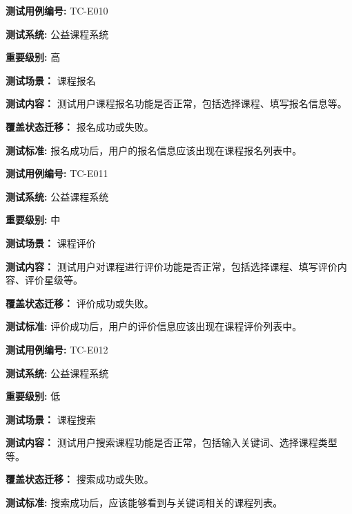 \begin{framed} \textbf{测试用例编号:} TC-E010

\textbf{测试系统:} 公益课程系统

\textbf{重要级别:} 高

\textbf{测试场景：} 课程报名

\textbf{测试内容：} 测试用户课程报名功能是否正常，包括选择课程、填写报名信息等。

\textbf{覆盖状态迁移：} 报名成功或失败。

\textbf{测试标准:} 报名成功后，用户的报名信息应该出现在课程报名列表中。

\begin{center}  \end{center} \end{framed}

\begin{framed} \textbf{测试用例编号:} TC-E011

\textbf{测试系统:} 公益课程系统

\textbf{重要级别:} 中

\textbf{测试场景：} 课程评价

\textbf{测试内容：} 测试用户对课程进行评价功能是否正常，包括选择课程、填写评价内容、评价星级等。

\textbf{覆盖状态迁移：} 评价成功或失败。

\textbf{测试标准:} 评价成功后，用户的评价信息应该出现在课程评价列表中。

\begin{center}  \end{center} \end{framed}

\begin{framed} \textbf{测试用例编号:} TC-E012

\textbf{测试系统:} 公益课程系统

\textbf{重要级别:} 低

\textbf{测试场景：} 课程搜索

\textbf{测试内容：} 测试用户搜索课程功能是否正常，包括输入关键词、选择课程类型等。

\textbf{覆盖状态迁移：} 搜索成功或失败。

\textbf{测试标准:} 搜索成功后，应该能够看到与关键词相关的课程列表。

\begin{center}  \end{center} \end{framed}


